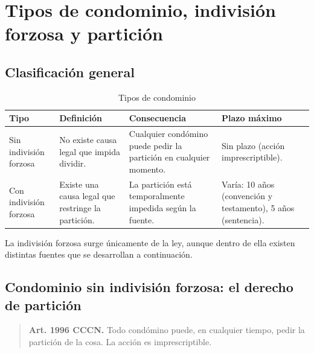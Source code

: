 \documentclass[12pt,oneside]{book}
\begin{document}
\chapter[Tipos de condominio y partición]{Tipos de condominio, indivisión forzosa y partición}

\section{Clasificación general}

\begin{table}[H]
\centering
\begin{tabularx}{\textwidth}{
    >{\raggedright\arraybackslash}p{}
    >{\raggedright\arraybackslash}X
    >{\raggedright\arraybackslash}X
    >{\raggedright\arraybackslash}X
}
\toprule
\textbf{Tipo} & \textbf{Definición} & \textbf{Consecuencia} & \textbf{Plazo máximo} \\
\midrule
Sin indivisión forzosa & No existe causa legal que impida dividir. & Cualquier condómino puede pedir la partición en cualquier momento. & Sin plazo (acción imprescriptible). \\
Con indivisión forzosa & Existe una causa legal que restringe la partición. & La partición está temporalmente impedida según la fuente. & Varía: 10 años (convención y testamento), 5 años (sentencia). \\
\bottomrule
\end{tabularx}
\caption{Tipos de condominio}
\end{table}

La indivisión forzosa surge únicamente de la ley, aunque dentro de ella existen distintas fuentes que se desarrollan a continuación.


\section{Condominio sin indivisión forzosa: el derecho de partición}

\begin{quote}
\textbf{Art. 1996 CCCN.} Todo condómino puede, en cualquier tiempo, pedir la partición de la cosa. La acción es imprescriptible.
\end{quote}
\end{document}
